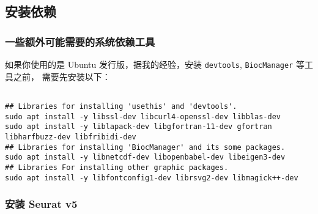 \documentclass[
]{article}
\begin{document}
\hypertarget{ux5b89ux88c5ux4f9dux8d56}{%
\subsection{安装依赖}\label{ux5b89ux88c5ux4f9dux8d56}}

\hypertarget{ux4e00ux4e9bux989dux5916ux53efux80fdux9700ux8981ux7684ux7cfbux7edfux4f9dux8d56ux5de5ux5177}{%
\subsubsection{一些额外可能需要的系统依赖工具}\label{ux4e00ux4e9bux989dux5916ux53efux80fdux9700ux8981ux7684ux7cfbux7edfux4f9dux8d56ux5de5ux5177}}

如果你使用的是 Ubuntu 发行版，据我的经验，安装 \texttt{devtools}, \texttt{BiocManager} 等工具之前，
需要先安装以下：

\begin{tcolorbox}[colback = gray!10, colframe = red!50, width = 16cm, arc = 1mm, auto outer arc, title = {Bash input}]
\begin{verbatim}

## Libraries for installing 'usethis' and 'devtools'.
sudo apt install -y libssl-dev libcurl4-openssl-dev libblas-dev
sudo apt install -y liblapack-dev libgfortran-11-dev gfortran libharfbuzz-dev libfribidi-dev
## Libraries for installing 'BiocManager' and its some packages.
sudo apt install -y libnetcdf-dev libopenbabel-dev libeigen3-dev
## Libraries For installing other graphic packages.
sudo apt install -y libfontconfig1-dev librsvg2-dev libmagick++-dev

\end{verbatim}
\end{tcolorbox}

\hypertarget{ux5b89ux88c5-seurat-v5}{%
\subsubsection{安装 Seurat v5}\label{ux5b89ux88c5-seurat-v5}}
\end{document}
